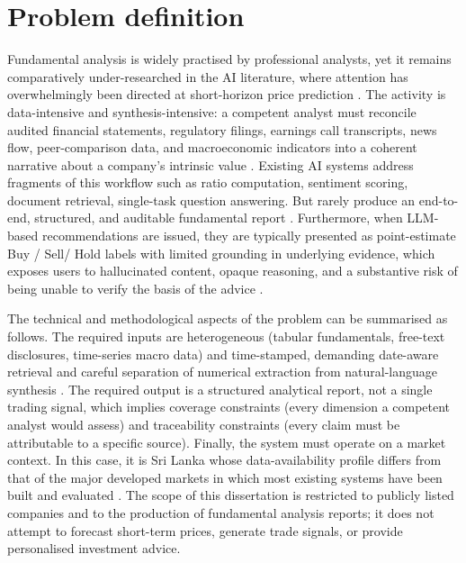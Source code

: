 \section{Problem definition}
\label{sec:problem}

Fundamental analysis is widely practised by professional analysts, yet it remains comparatively under-researched in the AI literature, where attention has overwhelmingly been directed at short-horizon price prediction \citep{Tripathi2025,Li2026FINSABER}. The activity is data-intensive and synthesis-intensive: a competent analyst must reconcile audited financial statements, regulatory filings, earnings call transcripts, news flow, peer-comparison data, and macroeconomic indicators into a coherent narrative about a company's intrinsic value \citep{Cernevicene2024,Fatouros2025MarketSense}. Existing AI systems address fragments of this workflow such as ratio computation, sentiment scoring, document retrieval, single-task question answering. But rarely produce an end-to-end, structured, and auditable fundamental report \citep{Papasotiriou2024,Bangun2025}. Furthermore, when LLM-based recommendations are issued, they are typically presented as point-estimate Buy / Sell/ Hold labels with limited grounding in underlying evidence, which exposes users to hallucinated content, opaque reasoning, and a substantive risk of being unable to verify the basis of the advice \citep{Cernevicene2024,Acharya2025AgenticAI}.

The technical and methodological aspects of the problem can be summarised as follows. The required inputs are heterogeneous (tabular fundamentals, free-text disclosures, time-series macro data) and time-stamped, demanding date-aware retrieval and careful separation of numerical extraction from natural-language synthesis \citep{Fatouros2025MarketSense,Xu2024IE}. The required output is a structured analytical report, not a single trading signal, which implies coverage constraints (every dimension a competent analyst would assess) and traceability constraints (every claim must be attributable to a specific source). Finally, the system must operate on a market context. In this case, it is Sri Lanka whose data-availability profile differs from that of the major developed markets in which most existing systems have been built and evaluated \citep{Bangun2025}. The scope of this dissertation is restricted to publicly listed companies and to the production of fundamental analysis reports; it does not attempt to forecast short-term prices, generate trade signals, or provide personalised investment advice.


